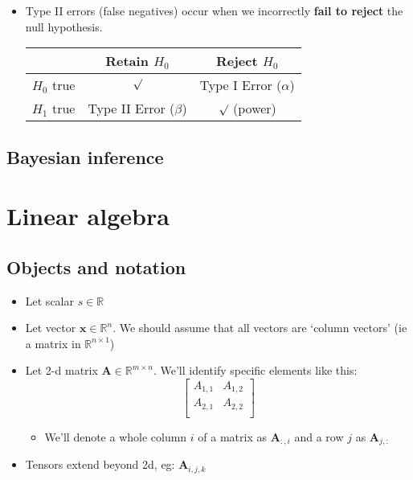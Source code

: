 \documentclass{article}
\begin{document}
\begin{multicols*}{2}
\begin{itemize}
    \item Type II errors (false negatives) occur when we incorrectly \textbf{fail to reject} the null hypothesis.
\begin{center}
\begin{tabular}{l|cc}
  & \textsf{Retain} $H_0$ & \textsf{Reject} $H_0$ \\
  \hline
  $H_0$ \textsf{true} & $\surd$ & Type I Error ($\alpha$)\\
  $H_1$ \textsf{true} & Type II Error ($\beta$) &
  $\surd$ (power) \\
\end{tabular}
\end{center}

\end{itemize}

\subsection{Bayesian inference}

\section{Linear algebra}
\subsection{Objects and notation}
\begin{itemize}
    \item Let scalar $s \in \mathbb{R}$
    \item Let vector $\bm{x} \in \mathbb{R}^n$. We should assume that all vectors are `column vectors' (ie a matrix in $\mathbb{R}^{n \times 1}$)
    \item Let 2-d matrix $\bm{A} \in \mathbb{R}^{m \times n}$. We'll identify specific elements like this:
    $$\begin{bmatrix}
    A_{1,1} & A_{1,2} \\
    A_{2,1} & A_{2,2} \\
    \end{bmatrix}$$
    \begin{itemize}
        \item We'll denote a whole column $i$ of a matrix as $\bm{A}_{:,i}$ and a row $j$ as $\bm{A}_{j, :}$
    \end{itemize}
    \item Tensors extend beyond 2d, eg: $\textbf{A}_{i,j,k}$
\end{itemize}

\end{multicols*}
\end{document}
